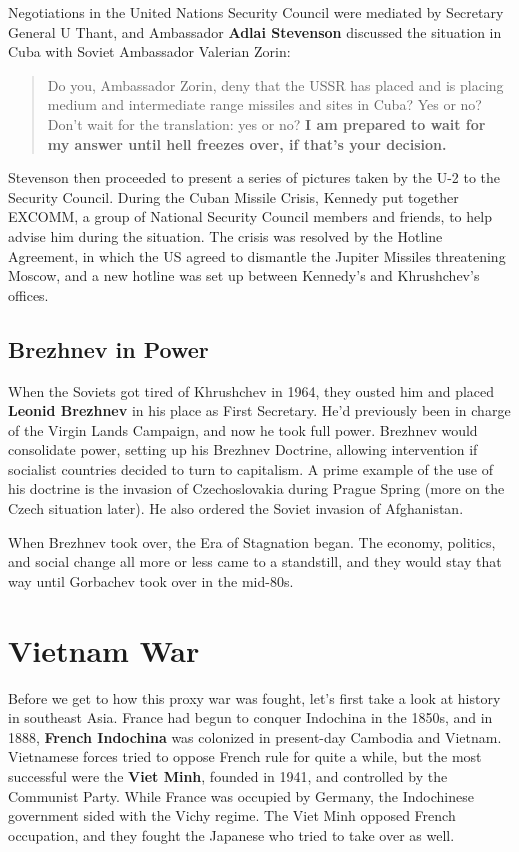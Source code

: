 Negotiations in the United Nations Security Council were mediated by Secretary General U Thant,
and Ambassador \textbf{Adlai Stevenson} discussed the situation in Cuba with Soviet Ambassador Valerian Zorin:
\begin{quote}
  Do you, Ambassador Zorin, deny that the USSR has placed
  and is placing medium and intermediate range missiles and sites in Cuba?
  Yes or no?
  Don't wait for the translation: yes or no?
  \textbf{I am prepared to wait for my answer until hell freezes over, if that's your decision.}
\end{quote}
Stevenson then proceeded to present a series of pictures taken by the U-2 to the Security Council.
During the Cuban Missile Crisis, Kennedy put together EXCOMM,
a group of National Security Council members and friends, to help advise him during the situation.
The crisis was resolved by the Hotline Agreement,
in which the US agreed to dismantle the Jupiter Missiles threatening Moscow,
and a new hotline was set up between Kennedy's and Khrushchev's offices.

\subsection*{Brezhnev in Power}

When the Soviets got tired of Khrushchev in 1964,
they ousted him and placed \textbf{Leonid Brezhnev} in his place as First Secretary.
He'd previously been in charge of the Virgin Lands Campaign, and now he took full power.
Brezhnev would consolidate power, setting up his Brezhnev Doctrine,
allowing intervention if socialist countries decided to turn to capitalism.
A prime example of the use of his doctrine is the invasion of Czechoslovakia during Prague Spring
(more on the Czech situation later).
He also ordered the Soviet invasion of Afghanistan.

When Brezhnev took over, the Era of Stagnation began.
The economy, politics, and social change all more or less came to a standstill,
and they would stay that way until Gorbachev took over in the mid-80s.

\section{Vietnam War}

Before we get to how this proxy war was fought, let's first take a look at history in southeast Asia.
France had begun to conquer Indochina in the 1850s, and in 1888,
\textbf{French Indochina} was colonized in present-day Cambodia and Vietnam.
Vietnamese forces tried to oppose French rule for quite a while,
but the most successful were the \textbf{Viet Minh}, founded in 1941,
and controlled by the Communist Party.
While France was occupied by Germany, the Indochinese government sided with the Vichy regime.
The Viet Minh opposed French occupation, and they fought the Japanese who tried to take over as well.

